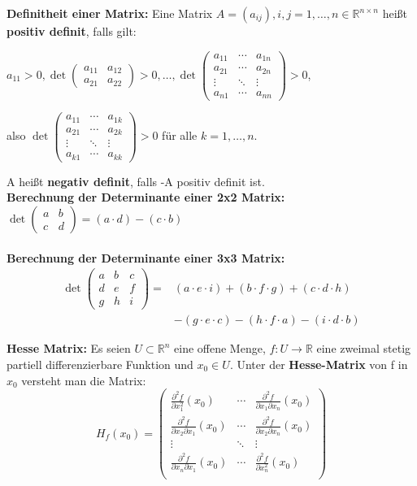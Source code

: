 \documentclass[fontset=ubuntu,12pt,a4paper,fleqn]{article}
\begin{document}
\textbf{Definitheit einer Matrix:} 
Eine Matrix \(A=(a_{ij}), i,j=1,\dots,n \in \mathbb{R}^{n\times n}\) heißt \textbf{positiv definit}, falls gilt:
{\fontsize{9}{10}
\begin{multicols}{2}
\(a_{11}>0,\det\begin{pmatrix}
a_{11} & a_{12} \\ a_{21} & a_{22}
\end{pmatrix} > 0, \dots, \det\begin{pmatrix}
a_{11} & \cdots & a_{1n} \\
a_{21} & \cdots & a_{2n} \\
\vdots & \ddots & \vdots \\
a_{n1} & \cdots & a_{nn}
\end{pmatrix} > 0\), 

also \(\det\begin{pmatrix}
a_{11} & \cdots & a_{1k} \\
a_{21} & \cdots & a_{2k} \\
\vdots & \ddots & \vdots \\
a_{k1} & \cdots & a_{kk}
\end{pmatrix} > 0\) für alle \(k=1,\dots,n\).

A heißt \textbf{negativ definit}, falls -A positiv definit ist.\\
\textbf{Berechnung der Determinante einer 2x2 Matrix:} \\

\(\det\begin{pmatrix}
a & b  \\ c & d
\end{pmatrix}
=  (a\cdot d) - (c\cdot b)\)
\\\\
\textbf{Berechnung der Determinante einer 3x3 Matrix:} 
\begin{align*}
\det\begin{pmatrix}
a & b & c  \\ d & e & f \\ g & h & i
\end{pmatrix}=&(a \cdot e \cdot i) + (b \cdot f \cdot g) + (c \cdot d \cdot h)\\
& - (g \cdot e \cdot c) - (h \cdot f \cdot a) - (i \cdot d \cdot b)
\end{align*}
\end{multicols}
}
\textbf{Hesse Matrix:}
Es seien \(U\subset\mathbb{R}^n\) eine offene Menge, \(f:U\to\mathbb{R}\) eine zweimal stetig partiell differenzierbare Funktion und \(x_0\in U\). Unter der \textbf{Hesse-Matrix} von f in \(x_0\) versteht man die Matrix: \[H_f(x_0)=\begin{pmatrix}
\frac{\partial^2 f}{\partial x_1^2}(x_0) & \cdots & \frac{\partial^2 f}{\partial x_1 \partial x_n}(x_0) \\
\frac{\partial^2 f}{\partial x_2 \partial x_1}(x_0) & \cdots & \frac{\partial^2 f}{\partial x_2 \partial x_n}(x_0) \\
\vdots & \ddots & \vdots \\
\frac{\partial^2 f}{\partial x_n \partial x_1}(x_0) & \cdots & \frac{\partial^2 f}{\partial x_n^2}(x_0) \\
\end{pmatrix}\]
\end{document}
